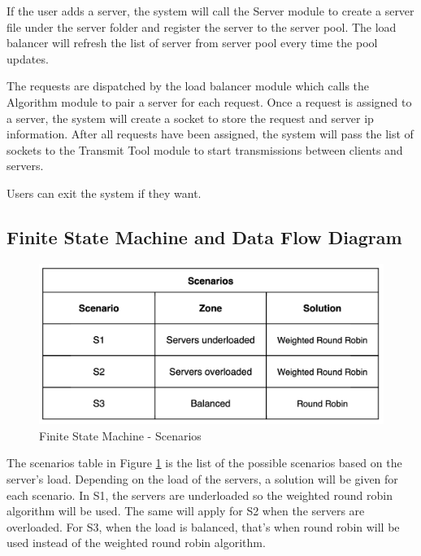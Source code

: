 \documentclass[12pt]{article}
\begin{document}
If the user adds a server, the system will call the Server module to create a server file under the server folder and register the server to the server pool. The load balancer will refresh the list of server from server pool every time the pool updates.

The requests are dispatched by the load balancer module which calls the Algorithm module to pair a server for each request. 
Once a request is assigned to a server, the system will create a socket to store the request and server ip information. After all requests have been assigned, the system will pass the list of sockets to the Transmit Tool module to start transmissions between clients and servers.

Users can exit the system if they want.

\subsection{Finite State Machine and Data Flow Diagram}

\begin{figure}[H]
\centering
\includegraphics[width=\linewidth]{images/load_balancer_scenarios.jpg}
\caption{Finite State Machine - Scenarios}
\label{fig:Scenarios}
\end{figure}

The scenarios table in Figure \ref{fig:Scenarios} is the list of the possible scenarios based on the server’s load. Depending on the load of the servers, a solution will be given for each scenario. In S1, the servers are underloaded so the weighted round robin algorithm will be used. The same will apply for S2 when the servers are overloaded. For S3, when the load is balanced, that’s when round robin will be used instead of the weighted round robin algorithm.
\end{document}
